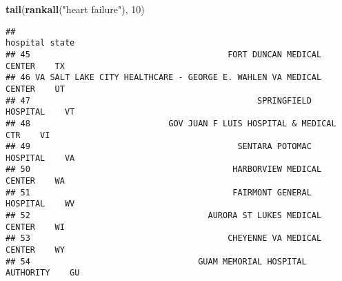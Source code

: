 \documentclass[
]{article}
\newenvironment{Shaded}{\begin{snugshade}}{\end{snugshade}}
\newcommand{\DecValTok}[1]{\textcolor[rgb]{0.00,0.00,0.81}{#1}}
\newcommand{\FunctionTok}[1]{\textcolor[rgb]{0.13,0.29,0.53}{\textbf{#1}}}
\newcommand{\NormalTok}[1]{#1}
\newcommand{\StringTok}[1]{\textcolor[rgb]{0.31,0.60,0.02}{#1}}
\begin{document}
\begin{Shaded}
\begin{Highlighting}[]
\FunctionTok{tail}\NormalTok{(}\FunctionTok{rankall}\NormalTok{(}\StringTok{"heart failure"}\NormalTok{), }\DecValTok{10}\NormalTok{)}
\end{Highlighting}
\end{Shaded}

\begin{verbatim}
##                                                             hospital state
## 45                                        FORT DUNCAN MEDICAL CENTER    TX
## 46 VA SALT LAKE CITY HEALTHCARE - GEORGE E. WAHLEN VA MEDICAL CENTER    UT
## 47                                              SPRINGFIELD HOSPITAL    VT
## 48                            GOV JUAN F LUIS HOSPITAL & MEDICAL CTR    VI
## 49                                          SENTARA POTOMAC HOSPITAL    VA
## 50                                         HARBORVIEW MEDICAL CENTER    WA
## 51                                         FAIRMONT GENERAL HOSPITAL    WV
## 52                                    AURORA ST LUKES MEDICAL CENTER    WI
## 53                                        CHEYENNE VA MEDICAL CENTER    WY
## 54                                  GUAM MEMORIAL HOSPITAL AUTHORITY    GU
\end{verbatim}
\end{document}
